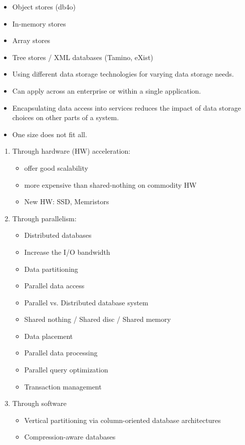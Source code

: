 \begin{breakbox}
\begin{itemize}
	\item Object stores (db4o)
	\item In-memory stores
	\item Array stores
	\item Tree stores / XML databases (Tamino, eXist)
\end{itemize}
\end{breakbox}

\begin{breakbox}
\begin{itemize}
	\item Using different data storage technologies for varying data storage needs.
	\item Can apply across an enterprise or within a single application.
	\item Encapsulating data access into services reduces the impact of data storage choices on other parts of a system.
	\item One size does not fit all.
\end{itemize}
\end{breakbox}

\begin{breakbox}
\begin{enumerate}
	\item Through hardware (HW) acceleration:
		\begin{itemize}
			\item offer good scalability
			\item more expensive than shared-nothing on commodity HW
			\item New HW: SSD, Memristors
		\end{itemize}
	\item Through parallelism:
		\begin{itemize}
			\item Distributed databases
			\item Increase the I/O bandwidth
			\item Data partitioning
			\item Parallel data access
			\item Parallel vs. Distributed database system
			\item Shared nothing / Shared disc / Shared memory
			\item Data placement
			\item Parallel data processing
			\item Parallel query optimization
			\item Transaction management
		\end{itemize}
	\item Through software
		\begin{itemize}
			\item Vertical partitioning via column-oriented database architectures
			\item Compression-aware databases
		\end{itemize}
\end{enumerate}
\end{breakbox}
